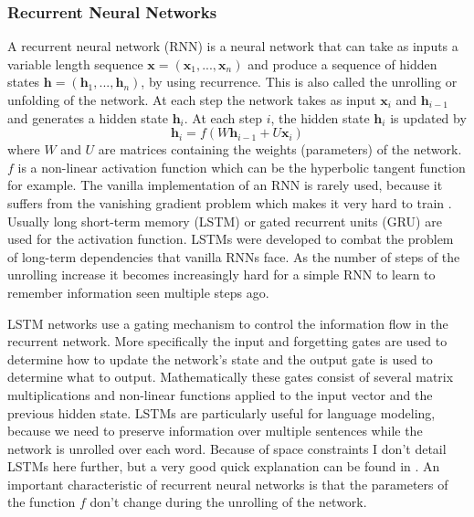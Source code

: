 \documentclass[12pt]{article}
\begin{document}
\subsubsection{Recurrent Neural Networks} \label{sssec:231}
A recurrent neural network (RNN) \cite{RNN:1988} is a neural network that can take as inputs a variable length sequence \(\bm{x}=(\bm{x}_1,...,\bm{x}_n)\) and produce a sequence of hidden states \(\bm{h}=(\bm{h}_1,...,\bm{h}_n)\), by using recurrence. This is also called the unrolling or unfolding of the network. At each step the network takes as input \(\bm{x}_i\) and \(\bm{h}_{i-1}\) and generates a hidden state \(\bm{h}_i\). At each step \(i\), the hidden state \(\bm{h}_i\) is updated by
\begin{equation} \label{eq231a}
\bm{h}_i=f(W\bm{h}_{i-1}+U\bm{x}_i)
\end{equation}
where \(W\) and \(U\) are matrices containing the weights (parameters) of the network. \(f\) is a non-linear activation function which can be the hyperbolic tangent function for example. The vanilla implementation of an RNN is rarely used, because it suffers from the vanishing gradient problem which makes it very hard to train \cite{Hochreiter:1998}. Usually long short-term memory (LSTM) \cite{Hochreiter:1997} or gated recurrent units (GRU) \cite{Cho:2014} are used for the activation function. LSTMs were developed to combat the problem of long-term dependencies that vanilla RNNs face. As the number of steps of the unrolling increase it becomes increasingly hard for a simple RNN to learn to remember information seen multiple steps ago. 

LSTM networks use a gating mechanism to control the information flow in the recurrent network. More specifically the input and forgetting gates are used to determine how to update the network's state and the output gate is used to determine what to output. Mathematically these gates consist of several matrix multiplications and non-linear functions applied to the input vector and the previous hidden state. LSTMs are particularly useful for language modeling, because we need to preserve information over multiple sentences while the network is unrolled over each word. Because of space constraints I don't detail LSTMs here further, but a very good quick explanation can be found in \cite{LSTM_article}. An important characteristic of recurrent neural networks is that the parameters of the function \(f\) don't change during the unrolling of the network.
\end{document}
